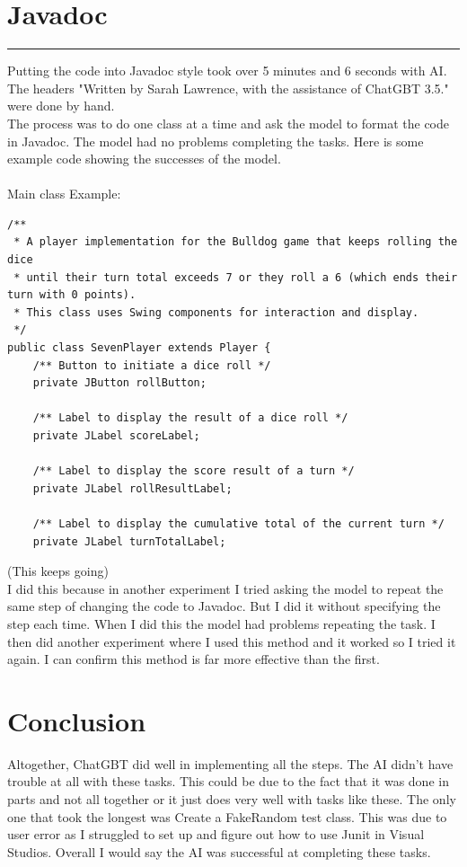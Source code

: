 \documentclass[a4paper,11pt]{article}
\begin{document}
\section*{Javadoc}
\hrule
\vspace{10pt} 
Putting the code into Javadoc style took over 5 minutes and 6 seconds with AI. The headers "Written by Sarah Lawrence, with the assistance of ChatGBT 3.5." were done by hand. \\
The process was to do one class at a time and ask the model to format the code in Javadoc. The model had no problems completing the tasks. Here is some example code showing the successes of the model.\\\\
Main class Example:
\begin{lstlisting}
/**
 * A player implementation for the Bulldog game that keeps rolling the dice
 * until their turn total exceeds 7 or they roll a 6 (which ends their turn with 0 points).
 * This class uses Swing components for interaction and display.
 */
public class SevenPlayer extends Player {
    /** Button to initiate a dice roll */
    private JButton rollButton;

    /** Label to display the result of a dice roll */
    private JLabel scoreLabel;

    /** Label to display the score result of a turn */
    private JLabel rollResultLabel;

    /** Label to display the cumulative total of the current turn */
    private JLabel turnTotalLabel;
\end{lstlisting} (This keeps going)\\
I did this because in another experiment I tried asking the model to repeat the same step of changing the code to Javadoc. But I did it without specifying the step each time. When I did this the model had problems repeating the task. I then did another experiment where I used this method and it worked so I tried it again. I can confirm this method is far more effective than the first. 

\section*{Conclusion}
Altogether, ChatGBT did well in implementing all the steps. The AI didn't have trouble at all with these tasks. This could be due to the fact that it was done in parts and not all together or it just does very well with tasks like these. The only one that took the longest was Create a FakeRandom test class. This was due to user error as I struggled to set up and figure out how to use Junit in Visual Studios. Overall I would say the AI was successful at completing these tasks. 
\end{document}
